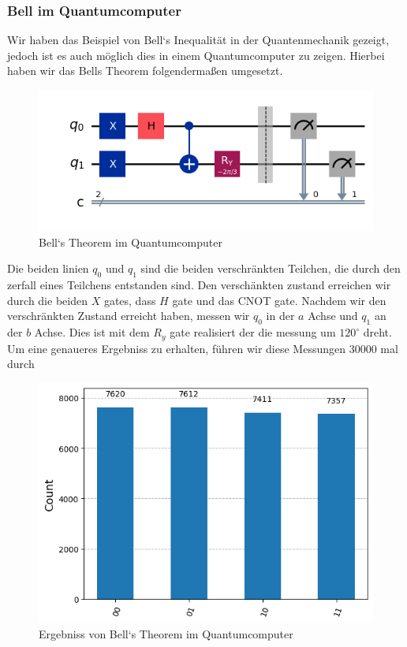 \subsubsection{Bell im Quantumcomputer}
\label{subsubsec:bell_quantumcomputer}
Wir haben das Beispiel von Bell`s Inequalität in der Quantenmechanik gezeigt, jedoch ist es auch möglich dies in einem Quantumcomputer zu zeigen.
Hierbei haben wir das Bells Theorem folgendermaßen umgesetzt.
\begin{figure}[H]
    \centering
    \includegraphics[width=0.9\linewidth]{img/BellCircuit.png}
    \caption{Bell`s Theorem im Quantumcomputer}
    \label{fig:BellCircuit}
\end{figure}

Die beiden linien $q_0$ und $q_1$ sind die beiden verschränkten Teilchen, die durch den zerfall eines Teilchens entstanden sind.
Den verschänkten zustand erreichen wir durch die beiden $X$ gates, dass $H$ gate und das CNOT gate.
Nachdem wir den verschränkten Zustand erreicht haben, messen wir $q_0$ in der $a$ Achse und $q_1$ an der $b$ Achse. Dies ist mit dem $R_y$ gate realisiert der die messung um $120^\circ$ dreht.\\

Um eine genaueres Ergebniss zu erhalten, führen wir diese Messungen 30000 mal durch
\begin{figure}[H]
    \centering
    \includegraphics[width=0.8\linewidth]{img/BellResult.png}
    \caption{Ergebniss von Bell`s Theorem im Quantumcomputer}
    \label{fig:BellResult}
\end{figure}

